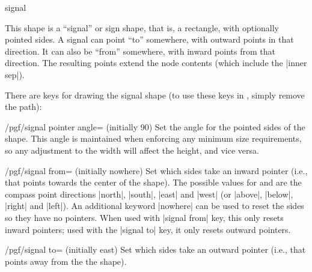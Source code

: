 \begin{shape}{signal}

	This shape is a ``signal'' or sign shape, that is, a rectangle, with
	optionally pointed sides. A signal can point ``to'' somewhere, with 
	outward points in that direction. It can also be ``from'' 
	somewhere, with inward points from that direction. The resulting 
	points extend the node contents (which include the |inner sep|).
	
\begin{codeexample}[]
\end{codeexample}

	There are \pgfname{} keys for drawing the signal shape (to use these
	keys in \tikzname{}, simply remove the  path):
	
	\begin{key}{/pgf/signal pointer angle= (initially 90)} 
		Set the angle for the pointed sides of the shape. This angle is
		maintained when enforcing any minimum size requirements, so
		any adjustment to the width will affect the height, and vice versa.
	\end{key}
	
	\begin{key}{/pgf/signal from=\space{} (initially nowhere)} 
		Set which sides take an inward pointer (i.e., that points towards the
		center of the shape). The possible values for  and 
		 are the compass point directions |north|,
		|south|, |east| and |west| (or |above|, |below|, |right| and |left|).
		An additional keyword |nowhere| can be used to reset the sides so 
		they have no pointers. When used with |signal from| key, this only 
		resets inward pointers;	used with the |signal to| key, it only 
		resets outward pointers. 
		
	\end{key}
	
	\begin{key}{/pgf/signal to=\space{} (initially east)} 
		Set which sides take an outward pointer (i.e., that points away from 
		the	the shape). 
	\end{key}
	

\end{shape}
